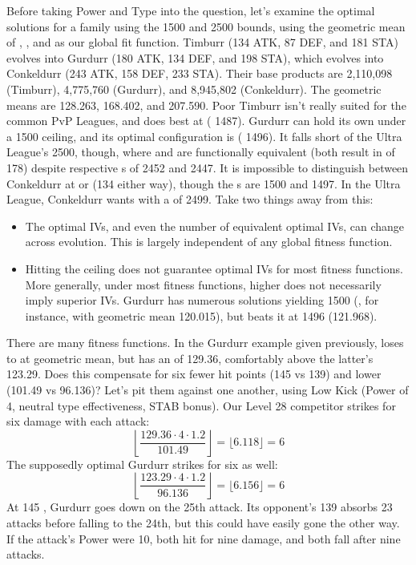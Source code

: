 Before taking Power and Type into the question, let's examine the optimal
 solutions for a family using the 1500 and 2500 \CP{} bounds, using the
 geometric mean of , , and \MHP{} as our global fit function.
Timburr (134 ATK, 87 DEF, and 181 STA) evolves into
  Gurdurr (180 ATK, 134 DEF, and 198 STA), which evolves into
  Conkeldurr (243 ATK, 158 DEF, 233 STA).
Their base products are 2,110,098 (Timburr), 4,775,760 (Gurdurr),
  and 8,945,802 (Conkeldurr).
The geometric means are 128.263, 168.402, and 207.590.
Poor Timburr isn't really suited for the common PvP Leagues,
  and does best at  (\CP{} 1487).
Gurdurr can hold its own under a 1500 \CP{} ceiling, and its
  optimal configuration is  (\CP{} 1496).
It falls short of the Ultra League's 2500, though, where
   and  are functionally equivalent
  (both result in \MHP{} of 178) despite respective \CP{}s of 2452 and 2447.
It is impossible to distinguish between Conkeldurr at
   or  (134 \MHP{} either way), though
  the \CP{}s are 1500 and 1497.
In the Ultra League, Conkeldurr wants  with a \CP{} of 2499.
Take two things away from this:
\begin{itemize}
\item The optimal IVs, and even the number of equivalent optimal IVs, can change across evolution.
  This is largely independent of any global fitness function.
\item Hitting the ceiling does not guarantee optimal IVs for most fitness functions.
  More generally, under most fitness functions, higher \CP{} does not necessarily imply superior IVs.
    Gurdurr has numerous solutions yielding 1500 \CP{} (, for instance, with geometric
    mean 120.015), but  beats it at 1496 (121.968).
\end{itemize}
There are many fitness functions. In the Gurdurr example given previously,  loses
    to  at geometric mean, but has an  of 129.36, comfortably above the latter's 123.29.
 Does this compensate for six fewer hit points (145 vs 139) and lower  (101.49 vs 96.136)?
 Let's pit them against one another, using Low Kick (Power of 4, neutral type effectiveness, STAB bonus).
 Our Level 28 competitor strikes for six damage with each attack:
    \[ \left\lfloor \frac{129.36 \cdot 4 \cdot 1.2}{101.49} \right\rfloor = \lfloor 6.118 \rfloor = 6 \]
 The supposedly optimal Gurdurr strikes for six as well:
    \[ \left\lfloor \frac{123.29 \cdot 4 \cdot 1.2}{96.136} \right\rfloor = \lfloor 6.156 \rfloor = 6 \]
 At 145 \HP, Gurdurr goes down on the 25th attack.
 Its opponent's 139 \HP{} absorbs 23 attacks before falling to the 24th, but this could
    have easily gone the other way.
 If the attack's Power were 10, both hit for nine damage, and both fall after nine attacks.

